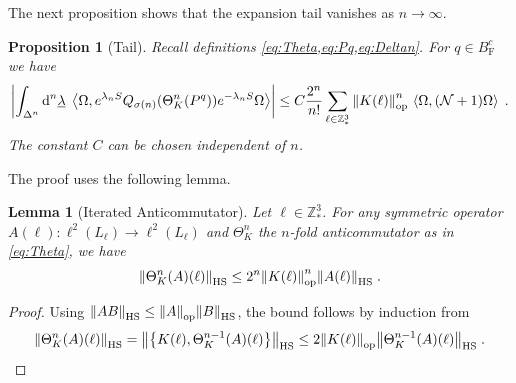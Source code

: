 \documentclass[12pt,a4paper]{article}
\numberwithin{equation}{section}
\newcommand{\1}{\mathbb{I}}
\newcommand{\di}{\textnormal{d}}
\newcommand{\F}{\mathrm{F}}
\newcommand{\HS}{\mathrm{HS}}
\newcommand{\Z}{\mathbb{Z}}
\newcommand{\NN}{\mathcal{N}}
\newcommand{\eva}[1]{\left\langle #1 \right\rangle}
\theoremstyle{plain}
\newtheorem{lemma}[theorem]{Lemma}
\newtheorem{proposition}[theorem]{Proposition}
\theoremstyle{definition}
\theoremstyle{remark}
\theoremstyle{plain}
\theoremstyle{definition}
\theoremstyle{remark}
\begin{document}
The next proposition shows that the expansion tail vanishes as $ n \to \infty $.
%
\begin{proposition}[Tail]\label{prop:headerr}
Recall definitions \cref{eq:Theta,eq:Pq,eq:Deltan}. For $q \in B^c_{\F}$ we have
\begin{equation}\label{eq:headest}
	\abs{\int_{\Delta^n} \di^n\underline{\lambda} \;
		\eva{\Omega, e^{\lambda_n S}Q_{\sigma(n)}(\Theta^n_{K}(P^q)) e^{-\lambda_n S} \Omega} }
	\leq C \frac{2^n}{n!} \sum_{\ell \in \Z^3_*} \norm{K(\ell)}^n_{\mathrm{op}} \, \eva{\Omega,(\NN+1)\Omega} \;.
\end{equation}
The constant $C$ can be chosen independent of $n$.
\end{proposition}
%
The proof uses the following lemma.
%
\begin{lemma}[Iterated Anticommutator]\label{lem:multicommest}
Let $ \ell \in \Z^3_* $. For any symmetric operator $ A(\ell): \ell^2(L_\ell) \to \ell^2(L_\ell) $ and $\Theta^n_K$ the $ n $-fold anticommutator as in \eqref{eq:Theta}, we have
\begin{equation}
	\norm{\Theta^{n}_K(A)(\ell)}_{\HS}
	\leq 2^n \norm{K(\ell)}^{n}_{\mathrm{op}}\norm{A(\ell)}_{\HS} \;.
\end{equation}
\end{lemma}
%
\begin{proof}
Using $\norm{AB}_{\HS} \leq \norm{A}_{\mathrm{op}} \norm{B}_{\HS}$, the bound follows by induction from
\[
	\norm{\Theta^{n}_K(A)(\ell)}_{\HS}
	= \norm{\left\{K(\ell),\Theta^{n-1}_K(A)(\ell)\right\}}_{\HS}
	\leq 2 \norm{K(\ell)}_{\mathrm{op}}\norm{\Theta^{n-1}_K(A)(\ell)}_{\HS} \;. \qedhere
\]
\end{proof}
\end{document}
